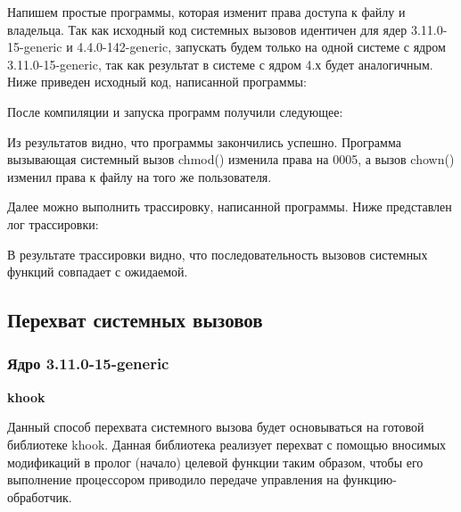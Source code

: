 \par Напишем простые программы, которая изменит права доступа к файлу и владельца. Так как исходный код системных вызовов идентичен для ядер 3.11.0-15-generic и 4.4.0-142-generic, запускать будем только на одной системе с ядром 3.11.0-15-generic, так как результат в системе с ядром 4.х будет аналогичным. Ниже приведен исходный код, написанной программы:





\par После компиляции и запуска программ получили следующее:






\par Из результатов видно, что программы закончились успешно. Программа вызывающая системный вызов chmod() изменила права на 0005, а вызов chown() изменил права к файлу на того же пользователя.

\par Далее можно выполнить трассировку, написанной программы. Ниже представлен лог трассировки:

 


\par В результате трассировки видно, что  последовательность вызовов системных функций совпадает с ожидаемой.



\subsection{Перехват системных вызовов} %


\subsubsection{Ядро 3.11.0-15-generic}

\textbf{khook}

\par Данный способ перехвата системного вызова будет основываться на готовой библиотеке khook. Данная библиотека реализует перехват с помощью вносимых модификаций в пролог (начало) целевой функции таким образом, чтобы его выполнение процессором приводило передаче управления на функцию-обработчик. \\

